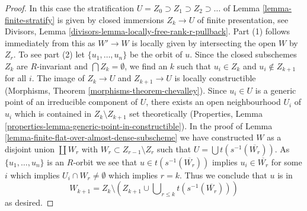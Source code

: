 \documentclass{stacks-project}
\theoremstyle{plain}
\theoremstyle{definition}
\theoremstyle{remark}
\numberwithin{equation}{subsection}
\begin{document}
\begin{proof}
In this case the stratification
$U = Z_0 \supset Z_1 \supset Z_2 \supset \ldots$ of
Lemma \ref{lemma-finite-stratify} is given by closed immersions $Z_k \to U$
of finite presentation, see
Divisors, Lemma \ref{divisors-lemma-locally-free-rank-r-pullback}.
Part (1) follows immediately from this as $W' \to W$ is locally given
by intersecting the open $W$ by $Z_r$. To see part (2)
let $\{u_1, \ldots, u_n\}$ be the orbit of $u$.
Since the closed subschemes $Z_k$ are $R$-invariant and
$\bigcap Z_k = \emptyset$, we find an $k$ such that $u_i \in Z_k$
and $u_i \not \in Z_{k + 1}$ for all $i$.
The image of $Z_k \to U$ and $Z_{k + 1} \to U$ is locally constructible
(Morphisms, Theorem \ref{morphisms-theorem-chevalley}).
Since $u_i \in U$ is a generic point of an irreducible component
of $U$, there exists an open neighbourhood $U_i$ of $u_i$ which
is contained in $Z_k \setminus Z_{k + 1}$ set theoretically
(Properties, Lemma \ref{properties-lemma-generic-point-in-constructible}).
In the proof of Lemma \ref{lemma-finite-flat-over-almost-dense-subscheme}
we have constructed $W$ as a disjoint union $\coprod W_r$
with $W_r \subset Z_{r - 1} \setminus Z_r$ such that
$U = \bigcup t(s^{-1}(\overline{W_r}))$. As $\{u_1, \ldots, u_n\}$
is an $R$-orbit we see that $u \in t(s^{-1}(\overline{W_r}))$
implies $u_i \in \overline{W_r}$ for some $i$ which implies
$U_i \cap W_r \not = \emptyset$ which implies $r = k$.
Thus we conclude that $u$ is in
$$
W_{k + 1} = Z_k \setminus
\left(
Z_{k + 1} \cup \bigcup\nolimits_{r \leq k} t(s^{-1}(\overline{W_r}))
\right)
$$
as desired.
\end{proof}
\end{document}
